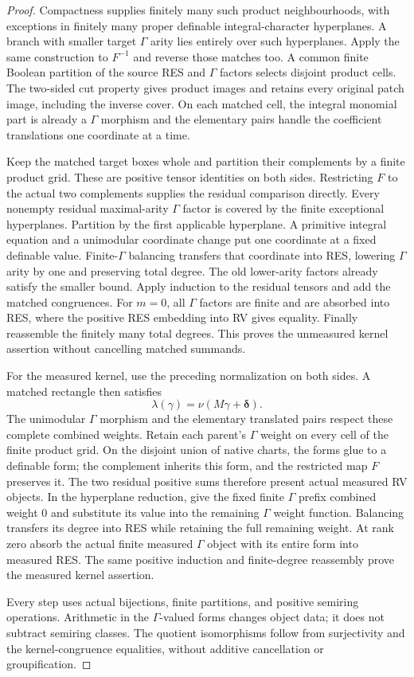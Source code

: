 \documentclass[12pt]{amsart}
\theoremstyle{plain}
\theoremstyle{definition}
\theoremstyle{remark}
\numberwithin{equation}{section}
\theoremstyle{plain}
\newcommand{\0}{\emptyset}
\begin{document}
\begin{proof}
Compactness supplies finitely many such product neighbourhoods, with
exceptions in finitely many proper definable integral-character
hyperplanes. A branch with smaller target $\Gamma$ arity lies entirely
over such hyperplanes. Apply the same construction to $F^{-1}$ and
reverse those matches too. A common finite Boolean partition of the
source RES and $\Gamma$ factors selects disjoint product cells. The
two-sided cut property gives product images and retains every original
patch image, including the inverse cover. On each matched cell, the
integral monomial part is already a $\Gamma$ morphism and the elementary
pairs handle the coefficient translations one coordinate at a time.

Keep the matched target boxes whole and partition their complements by
a finite product grid. These are positive tensor identities on both
sides. Restricting $F$ to the actual two complements supplies the
residual comparison directly. Every nonempty residual maximal-arity
$\Gamma$ factor is covered by the finite exceptional hyperplanes.
Partition by the first applicable hyperplane. A primitive integral
equation and a unimodular coordinate change put one coordinate at a
fixed definable value. Finite-$\Gamma$ balancing transfers that
coordinate into RES, lowering $\Gamma$ arity by one and preserving total
degree. The old lower-arity factors already satisfy the smaller bound.
Apply induction to the residual tensors and add the matched congruences.
For $m=0$, all $\Gamma$ factors are finite and are absorbed into RES, where
the positive RES embedding into RV gives equality. Finally reassemble
the finitely many total degrees. This proves the unmeasured kernel
assertion without cancelling matched summands.

For the measured kernel, use the preceding normalization on both
sides. A matched rectangle then satisfies
\[
 \lambda(\gamma)=\nu(M\gamma+\boldsymbol\delta).
\]
The unimodular $\Gamma$ morphism and the elementary translated pairs
respect these complete combined weights. Retain each parent's $\Gamma$
weight on every cell of the finite product grid. On the disjoint union
of native charts, the forms glue to a definable form;
the complement inherits this form, and the restricted map $F$ preserves
it. The two residual positive sums therefore present actual measured RV
objects. In the hyperplane reduction, give the fixed finite $\Gamma$
prefix combined weight $0$ and substitute its value into the remaining
$\Gamma$ weight function. Balancing transfers its degree into RES while
retaining the full remaining weight. At rank zero absorb the actual
finite measured $\Gamma$ object with its entire form into measured RES.
The same positive induction and finite-degree reassembly prove the
measured kernel assertion.

Every step uses actual bijections, finite partitions, and positive
semiring operations. Arithmetic in the $\Gamma$-valued forms changes
object data; it does not subtract semiring classes. The quotient
isomorphisms follow from surjectivity and the kernel-congruence
equalities, without additive cancellation or groupification.
\end{proof}
\end{document}
